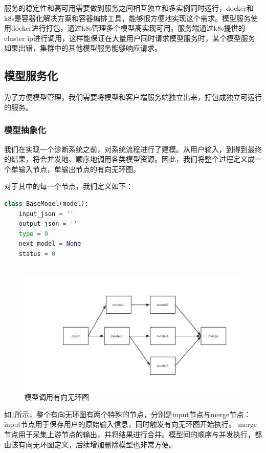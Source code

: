 服务的稳定性和高可用需要做到服务之间相互独立和多实例同时运行，docker和k8s是容器化解决方案和容器编排工具，能够很方便地实现这个需求。模型服务使用docker进行打包，通过k8s管理多个模型高实现可用。服务端通过k8s提供的cluster ip进行调用，这样能保证在大量用户同时请求模型服务时，某个模型服务如果出错，集群中的其他模型服务能够响应请求。


\subsection{模型服务化}
为了方便模型管理，我们需要将模型和客户端服务端独立出来，打包成独立可运行的服务。
\subsubsection{模型抽象化}
我们在实现一个诊断系统之前，对系统流程进行了建模。从用户输入，到得到最终的结果，将会并发地、顺序地调用各类模型资源。因此，我们将整个过程定义成一个单输入节点，单输出节点的有向无环图。

对于其中的每一个节点，我们定义如下：

\begin{lstlisting}[language={Python}, title=model.py]
class BaseModel(model):
    input_json = ''
    output_json = ''
    type = 0
    next_model = None
    status = 0
    
\end{lstlisting}


\begin{figure}[ht]
    \centering
    \includegraphics[width=15cm]{images/model.pdf}
    \caption{模型调用有向无环图}
    \label{fig:model_dag}
\end{figure}

如\ref{fig:model_dag}所示，整个有向无环图有两个特殊的节点，分别是input节点与merge节点：input节点用于保存用户的原始输入信息，同时触发有向无环图开始执行。
merge节点用于采集上游节点的输出，并将结果进行合并。模型间的顺序与并发执行，都由该有向无环图定义，后续增加删除模型也非常方便。

